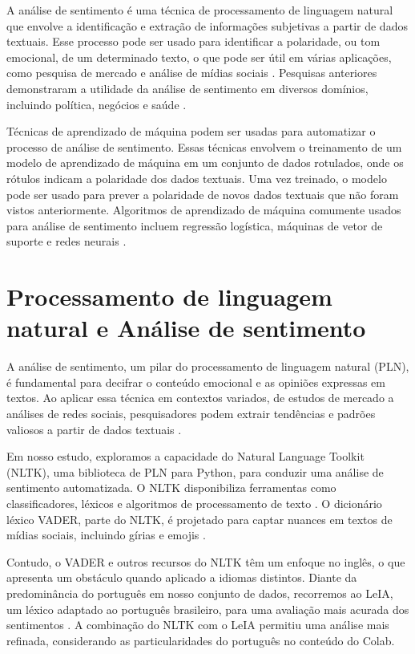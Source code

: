 A análise de sentimento é uma técnica de processamento de linguagem natural que envolve a identificação e extração de informações subjetivas a partir de dados textuais. Esse processo pode ser usado para identificar a polaridade, ou tom emocional, de um determinado texto, o que pode ser útil em várias aplicações, como pesquisa de mercado e análise de mídias sociais \cite{2008_Pang}. Pesquisas anteriores demonstraram a utilidade da análise de sentimento em diversos domínios, incluindo política, negócios e saúde \cite{2016_Chen_IP}.

Técnicas de aprendizado de máquina podem ser usadas para automatizar o processo de análise de sentimento. Essas técnicas envolvem o treinamento de um modelo de aprendizado de máquina em um conjunto de dados rotulados, onde os rótulos indicam a polaridade dos dados textuais. Uma vez treinado, o modelo pode ser usado para prever a polaridade de novos dados textuais que não foram vistos anteriormente. Algoritmos de aprendizado de máquina comumente usados para análise de sentimento incluem regressão logística, máquinas de vetor de suporte e redes neurais \cite{2013_Haddi}.

\section{Processamento de linguagem natural e Análise de sentimento}

A análise de sentimento, um pilar do processamento de linguagem natural (PLN), é fundamental para decifrar o conteúdo emocional e as opiniões expressas em textos. Ao aplicar essa técnica em contextos variados, de estudos de mercado a análises de redes sociais, pesquisadores podem extrair tendências e padrões valiosos a partir de dados textuais \cite{2008_Pang, 2015_Nguyen}.

Em nosso estudo, exploramos a capacidade do Natural Language Toolkit (NLTK), uma biblioteca de PLN para Python, para conduzir uma análise de sentimento automatizada. O NLTK disponibiliza ferramentas como classificadores, léxicos e algoritmos de processamento de texto \cite{2009_Bird_BOOK}. O dicionário léxico VADER, parte do NLTK, é projetado para captar nuances em textos de mídias sociais, incluindo gírias e emojis \cite{2014_Hutto}.

Contudo, o VADER e outros recursos do NLTK têm um enfoque no inglês, o que apresenta um obstáculo quando aplicado a idiomas distintos. Diante da predominância do português em nosso conjunto de dados, recorremos ao LeIA, um léxico adaptado ao português brasileiro, para uma avaliação mais acurada dos sentimentos \cite{2018_Almeida_PAGE}. A combinação do NLTK com o LeIA permitiu uma análise mais refinada, considerando as particularidades do português no conteúdo do Colab.


